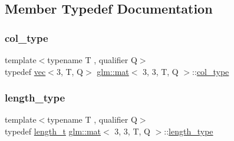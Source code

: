 \subsection{Member Typedef Documentation}
\mbox{\label{structglm_1_1mat_3_013_00_013_00_01_t_00_01_q_01_4_a4d84bef3685131dbb0ac43cac0a3b147}} 
\subsubsection{\texorpdfstring{col\+\_\+type}{col\_type}}
{\footnotesize\ttfamily template$<$typename T , qualifier Q$>$ \\
typedef \mbox{\hyperlink{structglm_1_1vec}{vec}}$<$3, T, Q$>$ \mbox{\hyperlink{structglm_1_1mat}{glm\+::mat}}$<$ 3, 3, T, Q $>$\+::\mbox{\hyperlink{structglm_1_1mat_3_013_00_013_00_01_t_00_01_q_01_4_a4d84bef3685131dbb0ac43cac0a3b147}{col\+\_\+type}}}

\mbox{\label{structglm_1_1mat_3_013_00_013_00_01_t_00_01_q_01_4_ae1b8524f20936516a48384a2841b5b9d}} 
\subsubsection{\texorpdfstring{length\+\_\+type}{length\_type}}
{\footnotesize\ttfamily template$<$typename T , qualifier Q$>$ \\
typedef \mbox{\hyperlink{namespaceglm_a090a0de2260835bee80e71a702492ed9}{length\+\_\+t}} \mbox{\hyperlink{structglm_1_1mat}{glm\+::mat}}$<$ 3, 3, T, Q $>$\+::\mbox{\hyperlink{structglm_1_1mat_3_013_00_013_00_01_t_00_01_q_01_4_ae1b8524f20936516a48384a2841b5b9d}{length\+\_\+type}}}

\mbox{\label{structglm_1_1mat_3_013_00_013_00_01_t_00_01_q_01_4_aa7593e64ea44bcccb91580e6f6a45110}} 

